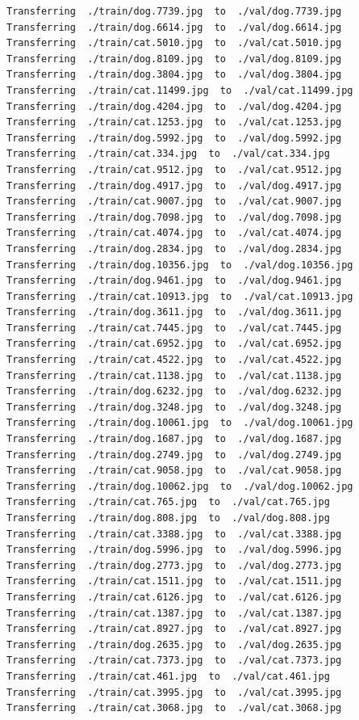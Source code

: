 \documentclass[]{book}
\theoremstyle{definition}
\theoremstyle{definition}
\theoremstyle{definition}
\theoremstyle{remark}
\begin{document}
\begin{verbatim}
Transferring  ./train/dog.7739.jpg  to  ./val/dog.7739.jpg
Transferring  ./train/dog.6614.jpg  to  ./val/dog.6614.jpg
Transferring  ./train/cat.5010.jpg  to  ./val/cat.5010.jpg
Transferring  ./train/dog.8109.jpg  to  ./val/dog.8109.jpg
Transferring  ./train/dog.3804.jpg  to  ./val/dog.3804.jpg
Transferring  ./train/cat.11499.jpg  to  ./val/cat.11499.jpg
Transferring  ./train/dog.4204.jpg  to  ./val/dog.4204.jpg
Transferring  ./train/cat.1253.jpg  to  ./val/cat.1253.jpg
Transferring  ./train/dog.5992.jpg  to  ./val/dog.5992.jpg
Transferring  ./train/cat.334.jpg  to  ./val/cat.334.jpg
Transferring  ./train/cat.9512.jpg  to  ./val/cat.9512.jpg
Transferring  ./train/dog.4917.jpg  to  ./val/dog.4917.jpg
Transferring  ./train/cat.9007.jpg  to  ./val/cat.9007.jpg
Transferring  ./train/dog.7098.jpg  to  ./val/dog.7098.jpg
Transferring  ./train/cat.4074.jpg  to  ./val/cat.4074.jpg
Transferring  ./train/dog.2834.jpg  to  ./val/dog.2834.jpg
Transferring  ./train/dog.10356.jpg  to  ./val/dog.10356.jpg
Transferring  ./train/dog.9461.jpg  to  ./val/dog.9461.jpg
Transferring  ./train/cat.10913.jpg  to  ./val/cat.10913.jpg
Transferring  ./train/dog.3611.jpg  to  ./val/dog.3611.jpg
Transferring  ./train/cat.7445.jpg  to  ./val/cat.7445.jpg
Transferring  ./train/cat.6952.jpg  to  ./val/cat.6952.jpg
Transferring  ./train/cat.4522.jpg  to  ./val/cat.4522.jpg
Transferring  ./train/cat.1138.jpg  to  ./val/cat.1138.jpg
Transferring  ./train/dog.6232.jpg  to  ./val/dog.6232.jpg
Transferring  ./train/dog.3248.jpg  to  ./val/dog.3248.jpg
Transferring  ./train/dog.10061.jpg  to  ./val/dog.10061.jpg
Transferring  ./train/dog.1687.jpg  to  ./val/dog.1687.jpg
Transferring  ./train/dog.2749.jpg  to  ./val/dog.2749.jpg
Transferring  ./train/cat.9058.jpg  to  ./val/cat.9058.jpg
Transferring  ./train/dog.10062.jpg  to  ./val/dog.10062.jpg
Transferring  ./train/cat.765.jpg  to  ./val/cat.765.jpg
Transferring  ./train/dog.808.jpg  to  ./val/dog.808.jpg
Transferring  ./train/cat.3388.jpg  to  ./val/cat.3388.jpg
Transferring  ./train/dog.5996.jpg  to  ./val/dog.5996.jpg
Transferring  ./train/dog.2773.jpg  to  ./val/dog.2773.jpg
Transferring  ./train/cat.1511.jpg  to  ./val/cat.1511.jpg
Transferring  ./train/cat.6126.jpg  to  ./val/cat.6126.jpg
Transferring  ./train/cat.1387.jpg  to  ./val/cat.1387.jpg
Transferring  ./train/cat.8927.jpg  to  ./val/cat.8927.jpg
Transferring  ./train/dog.2635.jpg  to  ./val/dog.2635.jpg
Transferring  ./train/cat.7373.jpg  to  ./val/cat.7373.jpg
Transferring  ./train/cat.461.jpg  to  ./val/cat.461.jpg
Transferring  ./train/cat.3995.jpg  to  ./val/cat.3995.jpg
Transferring  ./train/cat.3068.jpg  to  ./val/cat.3068.jpg

\end{verbatim}
\end{document}
